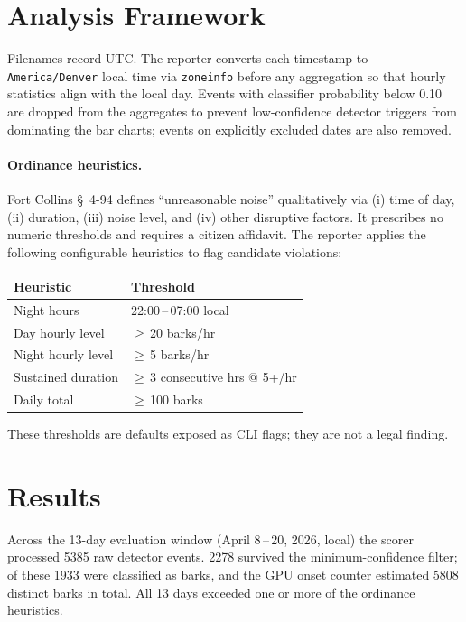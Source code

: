 \documentclass[10pt,twocolumn]{article}
\begin{document}
\section{Analysis Framework}
Filenames record UTC. The reporter converts each timestamp to
\texttt{America/Denver} local time via \texttt{zoneinfo} before any
aggregation so that hourly statistics align with the local day. Events
with classifier probability below \num{0.10} are dropped from the
aggregates to prevent low-confidence detector triggers from dominating
the bar charts; events on explicitly excluded dates are also removed.

\paragraph{Ordinance heuristics.} Fort Collins \S~4-94 defines
``unreasonable noise'' qualitatively via (i) time of day, (ii) duration,
(iii) noise level, and (iv) other disruptive factors. It prescribes no
numeric thresholds and requires a citizen affidavit. The reporter
applies the following configurable heuristics to flag candidate
violations:

\begin{center}
\small
\begin{tabular}{ll}
\toprule
Heuristic & Threshold \\
\midrule
Night hours            & 22:00\,--\,07:00 local \\
Day hourly level       & $\geq$\,\num{20} barks/hr \\
Night hourly level     & $\geq$\,\num{5} barks/hr \\
Sustained duration     & $\geq$\,\num{3} consecutive hrs @ \num{5}+/hr \\
Daily total            & $\geq$\,\num{100} barks \\
\bottomrule
\end{tabular}
\end{center}

These thresholds are defaults exposed as CLI flags; they are not a
legal finding.

\section{Results}
Across the \num{13}-day evaluation window (April 8\,--\,20, 2026, local)
the scorer processed \num{5385} raw detector events. \num{2278}
survived the minimum-confidence filter; of these \num{1933} were
classified as barks, and the GPU onset counter estimated \num{5808}
distinct barks in total. All \num{13} days exceeded one or more of the
ordinance heuristics.
\end{document}
